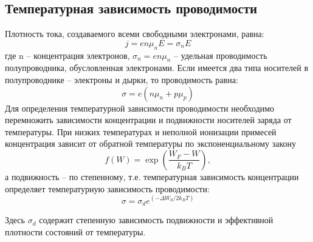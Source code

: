 \documentclass[a4paper,14pt]{extarticle}
\begin{document}



\subsection{Температурная зависимость проводимости}
Плотность тока, создаваемого всеми свободными электронами, равна:
\begin{equation}
	j=e n \mu_{n} E=\sigma_{n} E
	\label{eq:4.1}
\end{equation}
где n – концентрация электронов, $\sigma_n = e n \mu_n$ – удельная проводимость полупроводника, обусловленная электронами.
Если имеется два типа носителей в полупроводнике – электроны и дырки,
то проводимость равна:
\begin{equation}
	\sigma=e\left(n \mu_{n}+p \mu_{p}\right)
	\label{eq:4.2}
\end{equation}
Для определения температурной зависимости проводимости необходимо перемножить зависимости концентрации и подвижности носителей заряда от
температуры. При низких температурах и неполной ионизации примесей концентрация зависит от обратной температуры по экспоненциальному закону
\begin{equation}
	f(W) = \exp(\frac{W_F-W}{k_B T}),
	\label{eq:2.9}
\end{equation} 
а подвижность – по степенному, т.е. температурная зависимость концентрации определяет температурную зависимость проводимости:
\begin{equation}
	\sigma=\sigma_{d} e^{\left(-\Delta W_{d} / 2 k_{B} T\right)}
	\label{eq:4.3}
\end{equation}

Здесь $\sigma_d$ содержит степенную зависимость подвижности и эффективной плотности состояний от температуры.
\end{document}
